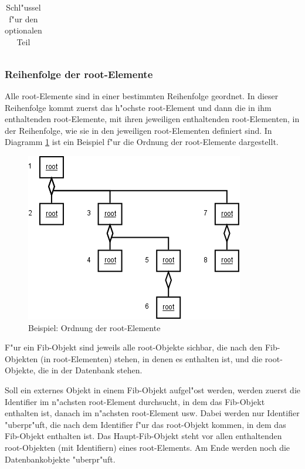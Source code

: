 \begin{small}
\begin{center}
\begin{longtable}{|p{23mm}|p{60mm}|p{40mm}|}
	
\caption{Schl"ussel f"ur den optionalen Teil}
\label{TableKeysOptionalpart}
\end{longtable}
\end{center}
\end{small}


\subsubsection{Reihenfolge der root-Elemente}
\label{secRootOrder}

Alle root-Elemente sind in einer bestimmten Reihenfolge geordnet. In dieser Reihenfolge kommt zuerst das h"ochste root-Element und dann die in ihm enthaltenden root-Elemente, mit ihren jeweiligen enthaltenden root-Elementen, in der Reihenfolge, wie sie in den jeweiligen root-Elementen definiert sind. In Diagramm \ref{figOrderRoot} ist ein Beispiel f"ur die Ordnung der root-Elemente dargestellt.

\begin{figure}[htbp]
\begin{center}
  \includegraphics[scale=0.4]{order_root}
\end{center}
\caption{Beispiel: Ordnung der root-Elemente}
\label{figOrderRoot}
\end{figure}

F"ur ein Fib-Objekt sind jeweils alle root-Objekte sichbar, die nach den Fib-Objekten (in root-Elementen) stehen, in denen es enthalten ist, und die root-Objekte, die in der Datenbank stehen.

Soll ein externes Objekt  in einem Fib-Objekt aufgel"ost werden, werden zuerst die Identifier im n"achsten root-Element durchsucht, in dem das Fib-Objekt enthalten ist, danach im n"achsten root-Element usw. Dabei werden nur Identifier "uberpr"uft, die nach dem Identifier f"ur das root-Objekt kommen, in dem das Fib-Objekt enthalten ist. Das Haupt-Fib-Objekt steht vor allen enthaltenden root-Objekten (mit Identifiern) eines root-Elements. Am Ende werden noch die Datenbankobjekte "uberpr"uft.

